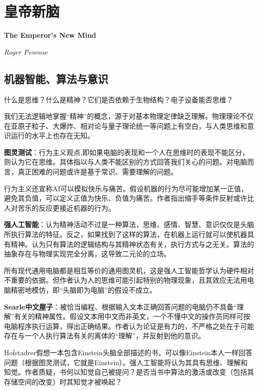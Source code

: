 
\chapter{皇帝新脑}
\Large\textbf{The Emperor's New Mind}
\par \emph{Roger Penrose} \normalsize

\section{机器智能、算法与意识}

\par 什么是思维？什么是精神？它们是否依赖于生物结构？电子设备能否思维？

\par 我们无法逻辑地掌握“精神”的概念，源于对基本物理定律缺乏理解。物理理论不仅在亚原子粒子、大爆炸、相对论与量子理论统一等问题上有空白，与人类思维和意识运行的水平上也存在无知。

\par \textbf{图灵测试}：行为主义观点,即如果电脑的表现和一个人在思维时的表现不能区分，则认为它在思维。具体指以与人类不能区别的方式回答我们关心的问题。对电脑而言，真正困难的问题或许是基于常识、需要理解的问题。

\par 行为主义还宣称AI可以模拟快乐与痛苦。假设机器的行为尽可能增加某一正值，避免其负值，可以定义正值为快乐、负值为痛苦。作者指出缩手等条件反射或许比人对苦乐的反应更接近机器的行为。

\par \textbf{强人工智能}：认为精神活动不过是一种算法，思维、感情、智慧、意识仅仅是头脑所执行算法的特征。反之，如果找到了这样的算法，在机器上运行就可以使机器具有精神。认为只有算法的逻辑结构与其精神状态有关，执行方式与之无关。算法的抽象存在与物理实现完全分离，这导致二元论的立场。

\par 所有现代通用电脑都是相互等价的通用图灵机，这是强人工智能哲学认为硬件相对不重要的依据。但作者认为人的思维可能引起特别的物理现象，且其效应无法用电脑精密地模仿，即“头脑即为电脑”的假设不成立。

\par \textbf{Searle中文屋子}：被恰当编程、根据输入文本正确回答问题的电脑仍不具备“理解”有关的精神属性。假设文本用中文而非英文，一个不懂中文的操作员同样可按电脑程序执行运算，得出正确结果。作者认为论证是有力的，不严格之处在于可能存在与一个人执行算法有关的离体的“理解”，并反射到他的意识。

\par Hofstadrer假想一本包含Einstein头脑全部描述的书，可以像Einstein本人一样回答问题（根据图灵测试，它就是Einstein）。强人工智能将认为其具有思维、理解和知觉。作者质疑，书何以知觉自己被提问？是否当书中算法的激活或改变（包括其存储空间的改变）时其知觉才被唤起？

